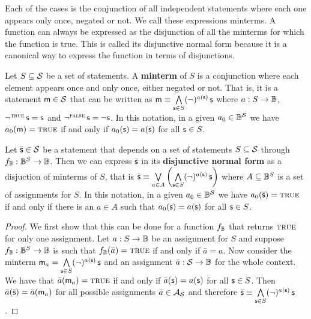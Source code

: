 \documentclass[11pt,letterpaper,fleqn]{memoir} %
\begin{document}
Each of the cases is the conjunction of all independent statements where each one appears only once, negated or not. We call these expressions minterms. A function can always be expressed as the disjunction of all the minterms for which the function is true. This is called its disjunctive normal form because it is a canonical way to express the function in terms of disjunctions.

\begin{mathSection}
\begin{defn}\label{def_minterm}
	Let $S \subseteq \logCtx$ be a set of statements. A \textbf{minterm} of $S$ is a conjunction where each element appears once and only once, either negated or not. That is, it is a statement $\stmt[m] \in \logCtx$ that can be written as $\stmt[m] \equiv \bigAND \limits_{\stmt \in S} (\NOT)^{a(\stmt)} \, \stmt$ where $a : S \to \Bool$, $\NOT ^ \TRUE \, \stmt = \stmt$ and $\NOT ^ \FALSE \, \stmt = \NOT \stmt$. In this notation, in a given $a_0 \in \Bool^\logCtx$ we have $a_0(\stmt[m]) = \TRUE$ if and only if $a_0(\stmt) = a(\stmt)$ for all $\stmt \in S$.
\end{defn}
	
	\begin{prop}\label{prop_disjunctive_normal_form}
		Let $\bar{\stmt} \in \logCtx$ be a statement that depends on a set of statements $S \subseteq \logCtx$ through $f_\Bool : \Bool^S \to \Bool$. Then we can express $\bar{\stmt}$ in its \textbf{disjunctive normal form} as a disjuction of minterms of $S$, that is $\bar{\stmt} \equiv \bigOR \limits_{a \in A} \left( \bigAND \limits_{\stmt \in S} (\NOT)^{a(\stmt)} \, \stmt \right)$ where $A \subseteq \Bool^S$ is a set of assignments for $S$. In this notation, in a given $a_0 \in \Bool^\logCtx$ we have $a_0(\bar{\stmt}) = \TRUE$ if and only if there is an $a \in A$ such that $a_0(\stmt) = a(\stmt)$ for all $\stmt \in S$.
	\end{prop}
	\begin{proof}
		We first show that this can be done for a function $f_\Bool$ that returns $\TRUE$ for only one assignment. Let $a : S \to \Bool$ be an assignment for $S$ and suppose $f_\Bool: \Bool^S \to \Bool$ is such that $f_\Bool(\bar{a}) = \TRUE$ if and only if $\bar{a} = a$. Now consider the minterm $\stmt[m]_a = \bigAND \limits_{\stmt \in S} (\NOT)^{a(\stmt)} \, \stmt$ and an assignment $\bar{a} : \logCtx \to \Bool$ for the whole context. We have that $\bar{a}(\stmt[m]_a) = \TRUE$ if and only if $\bar{a}(\stmt) = a(\stmt)$ for all $\stmt \in S$. Then $\bar{a}(\bar{\stmt}) = \bar{a}(\stmt[m]_a)$ for all possible assignments $\bar{a} \in \pAss$ and therefore $\bar{\stmt} \equiv \bigAND \limits_{\stmt \in S} (\NOT)^{a(\stmt)} \, \stmt$.


\end{proof}
\end{mathSection}
\end{document}
